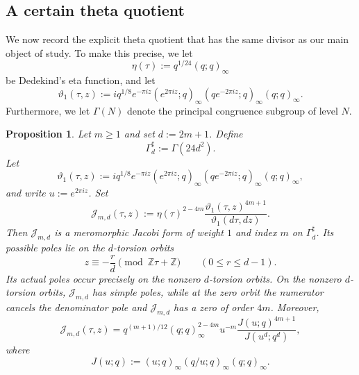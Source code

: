 \documentclass[12pt]{amsart}
\numberwithin{equation}{section}
\newtheorem{proposition}[theorem]{Proposition}
\begin{document}
\subsection{A certain theta quotient}

We now record the explicit theta quotient that has the same divisor as our main object of study.
To make this precise, we
let
\[
\eta(\tau):=q^{1/24}(q;q)_\infty
\]
be Dedekind's eta function, and let
\[
\vartheta_1(\tau,z)
:=
iq^{1/8}e^{-\pi i z}
(e^{2\pi i z};q)_\infty
(qe^{-2\pi i z};q)_\infty
(q;q)_\infty .
\]
Furthermore, we let \(\Gamma(N)\) denote the principal congruence subgroup of level \(N\).

\begin{proposition}\label{prop:jacobi-carrier}
Let $m\geq 1$ and set $d:=2m+1$.  Define
\[
\Gamma_d^{\sharp}:=\Gamma(24d^2).
\]
Let
\[
\vartheta_1(\tau,z):=i q^{1/8}e^{-\pi i z}(e^{2\pi i z};q)_\infty(qe^{-2\pi i z};q)_\infty(q;q)_\infty,
\]
and write $u:=e^{2\pi i z}$.  Set
\begin{equation}\label{eq:jacobi-carrier}
\mathcal J_{m,d}(\tau,z)
:=
\eta(\tau)^{2-4m}\frac{\vartheta_1(\tau,z)^{4m+1}}{\vartheta_1(d\tau,dz)}.
\end{equation}
Then $\mathcal J_{m,d}$ is a meromorphic Jacobi form of weight $1$ and index $m$ on $\Gamma_d^{\sharp}$.  Its possible poles lie on the \(d\)-torsion orbits
\[
z\equiv -\frac r d \pmod{\mathbb Z\tau+\mathbb Z}\qquad (0\le r\le d-1).
\]
Its actual poles occur precisely on the nonzero \(d\)-torsion orbits.
On the nonzero \(d\)-torsion orbits, \(\mathcal J_{m,d}\) has simple poles, while at the zero orbit the numerator cancels the denominator pole and \(\mathcal J_{m,d}\) has a zero of order \(4m\). Moreover,
\begin{equation}\label{eq:carrier-covering}
\mathcal J_{m,d}(\tau,z)
=
q^{(m+1)/12}(q;q)_\infty^{2-4m}u^{-m}\frac{J(u;q)^{4m+1}}{J(u^d;q^d)},
\end{equation}
where
\[
J(u;q):=(u;q)_\infty(q/u;q)_\infty(q;q)_\infty.
\]
\end{proposition}
\end{document}
